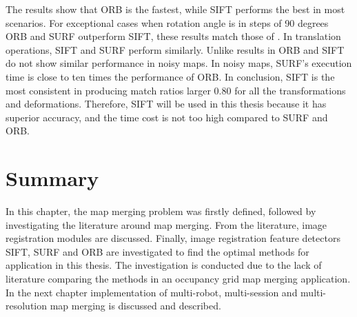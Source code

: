 The results show that ORB is the fastest, while SIFT performs the best in most scenarios. For exceptional cases when rotation angle is in steps of 90 degrees ORB and SURF outperform SIFT, these results match those of \cite{Karami2015}. In translation operations, SIFT and SURF perform similarly. Unlike results in \cite{Karami2015} ORB and SIFT do not show similar performance in noisy maps. In noisy maps, SURF's execution time is close to ten times the performance of ORB. In conclusion, SIFT is the most consistent in producing match ratios larger 0.80 for all the transformations and deformations. Therefore, SIFT will be used in this thesis because it has superior accuracy, and the time cost is not too high compared to SURF and ORB.


\section{Summary}

In this chapter, the map merging problem was firstly defined, followed by investigating the literature around map merging. From the literature, image registration modules are discussed. Finally, image registration feature detectors SIFT, SURF and ORB are investigated to find the optimal methods for application in this thesis. The investigation is conducted due to the lack of literature comparing the methods in an occupancy grid map merging application. In the next chapter implementation of multi-robot, multi-session and multi-resolution map merging is discussed and described.




%



